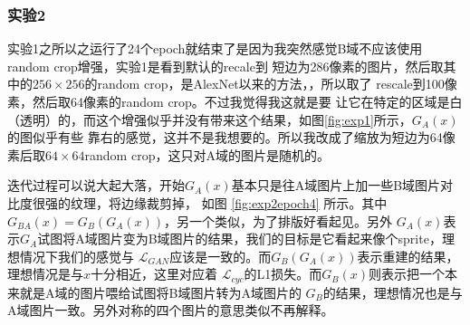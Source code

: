 \documentclass[twocolumn,11pt]{ctexart}
\begin{document}
\subsubsection{实验2}

实验1之所以之运行了24个epoch就结束了是因为我突然感觉B域不应该使用random crop增强，实验1是看到默认的recale到
短边为286像素的图片，然后取其中的$256 \times 256$的random crop，是AlexNet以来的方法，，所以取了
rescale到100像素，然后取64像素的random crop。不过我觉得我这就是要
让它在特定的区域是白（透明）的，而这个增强似乎并没有带来这个结果，如图\ref{fig:exp1}所示，$G_A(x)$的图似乎有些
靠右的感觉，这并不是我想要的。所以我改成了缩放为短边为64像素后取$64 \times 64$random crop，这只对A域的图片是随机的。

迭代过程可以说大起大落，开始$G_A(x)$基本只是往A域图片上加一些B域图片对比度很强的纹理，将边缘裁剪掉，
如图 \ref{fig:exp2epoch4} 所示。其中$G_{BA}(x)=G_B(G_A(x))$，另一个类似，为了排版好看起见。另外
$G_A(x)$表示$G_A$试图将A域图片变为B域图片的结果，我们的目标是它看起来像个sprite，理想情况下我们的感觉与
$\mathcal{L}_{GAN}$应该是一致的。而$G_B(G_A(x))$表示重建的结果，理想情况是与$x$十分相近，这里对应着
$\mathcal{L}_{cyc}$的L1损失。而$G_B(x)$则表示把一个本来就是A域的图片喂给试图将B域图片转为A域图片的
$G_B$的结果，理想情况也是与A域图片一致。另外对称的四个图片的意思类似不再解释。
\end{document}
